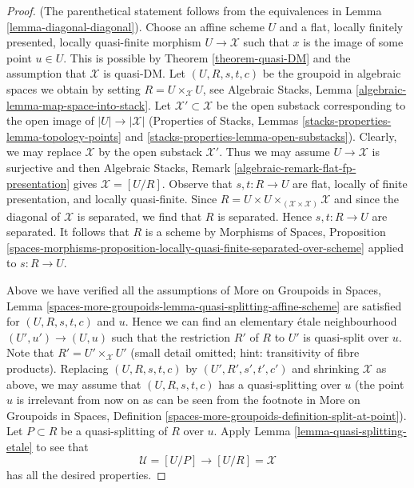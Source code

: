 \documentclass{stacks-project}
\theoremstyle{plain}
\theoremstyle{definition}
\theoremstyle{remark}
\numberwithin{equation}{subsection}
\begin{document}
\begin{proof}
(The parenthetical statement follows from the equivalences in
Lemma \ref{lemma-diagonal-diagonal}).
Choose an affine scheme $U$ and a flat, locally finitely presented,
locally quasi-finite morphism $U \to \mathcal{X}$ such that $x$
is the image of some point $u \in U$. This is possible by
Theorem \ref{theorem-quasi-DM} and the assumption that $\mathcal{X}$
is quasi-DM. Let $(U, R, s, t, c)$ be the groupoid in algebraic spaces
we obtain by setting $R = U \times_\mathcal{X} U$, see
Algebraic Stacks, Lemma \ref{algebraic-lemma-map-space-into-stack}.
Let $\mathcal{X}' \subset \mathcal{X}$ be the open substack corresponding
to the open image of $|U| \to |\mathcal{X}|$
(Properties of Stacks, Lemmas
\ref{stacks-properties-lemma-topology-points} and
\ref{stacks-properties-lemma-open-substacks}).
Clearly, we may replace $\mathcal{X}$ by the open substack $\mathcal{X}'$.
Thus we may assume $U \to \mathcal{X}$ is surjective and then
Algebraic Stacks, Remark \ref{algebraic-remark-flat-fp-presentation}
gives $\mathcal{X} = [U/R]$.
Observe that $s, t : R \to U$ are flat, locally of finite presentation,
and locally quasi-finite.
Since $R = U \times U \times_{(\mathcal{X} \times \mathcal{X})} \mathcal{X}$
and since the diagonal of $\mathcal{X}$ is separated, we find that
$R$ is separated. Hence $s, t : R \to U$ are separated. It follows
that $R$ is a scheme by
Morphisms of Spaces, Proposition
\ref{spaces-morphisms-proposition-locally-quasi-finite-separated-over-scheme}
applied to $s : R \to U$.

\medskip\noindent
Above we have verified all the assumptions of
More on Groupoids in Spaces, Lemma
\ref{spaces-more-groupoids-lemma-quasi-splitting-affine-scheme}
are satisfied for $(U, R, s, t, c)$ and $u$.
Hence we can find an elementary \'etale neighbourhood
$(U', u') \to (U, u)$ such that the restriction $R'$ of $R$ to $U'$
is quasi-split over $u$. Note that $R' = U' \times_\mathcal{X} U'$
(small detail omitted; hint: transitivity of fibre products).
Replacing $(U, R, s, t, c)$ by $(U', R', s', t', c')$ and shrinking
$\mathcal{X}$ as above, we may assume that $(U, R, s, t, c)$ has
a quasi-splitting over $u$ (the point $u$ is irrelevant from
now on as can be seen from the footnote in
More on Groupoids in Spaces, Definition
\ref{spaces-more-groupoids-definition-split-at-point}).
Let $P \subset R$ be a quasi-splitting of $R$ over $u$.
Apply Lemma \ref{lemma-quasi-splitting-etale}
to see that
$$
\mathcal{U} = [U/P] \longrightarrow [U/R] = \mathcal{X}
$$
has all the desired properties.
\end{proof}
\end{document}
